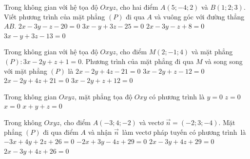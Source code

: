 \begin{ex}%
	Trong không gian với hệ tọa độ $Oxyz$, cho hai điểm $A(5;-4;2)$ và $B(1;2;3)$. Viết phương trình của mặt phẳng $(P)$ đi  qua $A$ và vuông góc với đường thẳng $AB$.
	\choice 
		{\True $2x - 3y - z - 20 = 0$} 
		{$3x - y + 3z  - 25 = 0$}
		{$2x  - 3y - z + 8 = 0$}
		{$3x - y  + 3z - 13 = 0$}
\end{ex}

\begin{ex}%
	Trong không gian với hệ tọa độ $Oxyz$, cho điểm $M(2;-1;4)$ và mặt phẳng $(P)\colon 3x - 2y + z + 1 = 0$. Phương trình của mặt phẳng đi qua $M$ và song  song với mặt phẳng $(P)$ là
	 \choice
		{$2x - 2y + 4z - 21  = 0$}
		{\True $3x - 2y +  z - 12 = 0$}
		{$2x - 2y +  4z + 21 = 0$}
		{$3x - 2y +  z + 12 = 0$}
\end{ex}

\begin{ex}%
	Trong không gian $Oxyz$, mặt  phẳng tọa độ $Oxy$ có phương trình là
	 \choice
		 {$y=0$}
		{\True  $z=0$}
		 {$x=0$}
		 {$x+y+z=0$}
\end{ex}

\begin{ex}%
	Trong không $Oxyz$, cho điểm $A(-3;4;-2)$ và vectơ $\overrightarrow{n}=(-2;3;-4)$. Mặt  phẳng $(P)$ đi qua điểm $A$ và nhận $\overrightarrow{n}$~làm vectơ pháp tuyến có phương trình~là
	\choice 
		 {$-3x+4y+2z+26=0$}
		{$-2x+3y-4z+29=0$} 
		{$2x-3y+4z+29=0$} 
		{\True  $2x-3y+4z+26=0$}
\end{ex}

